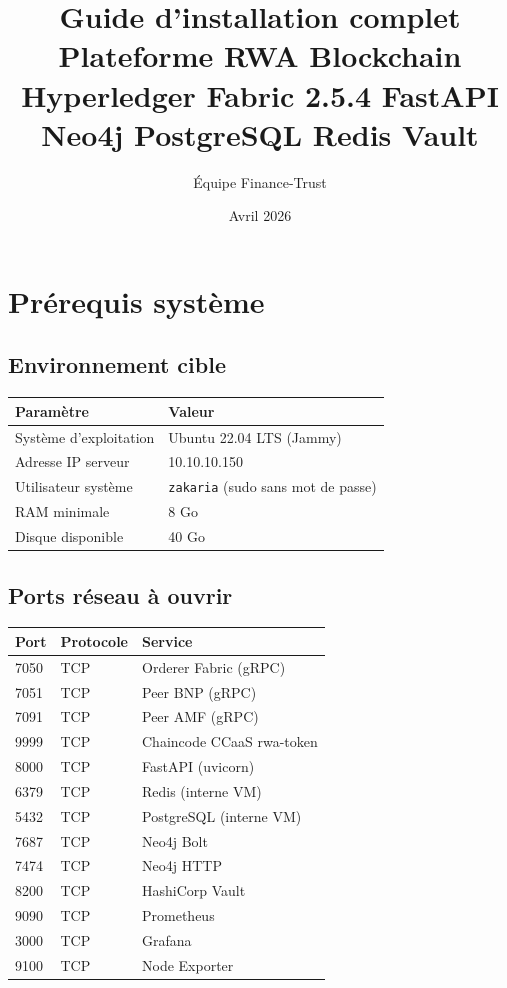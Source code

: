 \documentclass[12pt,a4paper,french]{article}
\title{
  \vspace{-1cm}
  {\LARGE\bfseries Guide d'installation complet}\\[0.5em]
  {\large Plateforme RWA Blockchain}\\[0.3em]
  {\normalsize Hyperledger Fabric 2.5.4 \textbar{} FastAPI \textbar{} Neo4j \textbar{}
   PostgreSQL \textbar{} Redis \textbar{} Vault}
}
\author{Équipe Finance-Trust}
\date{Avril 2026}
\begin{document}
\maketitle
\tableofcontents
\newpage

\section{Prérequis système}

\subsection{Environnement cible}

\begin{tabularx}{\linewidth}{lX}
\toprule
\textbf{Paramètre} & \textbf{Valeur} \\
\midrule
Système d'exploitation & Ubuntu 22.04 LTS (Jammy) \\
Adresse IP serveur & 10.10.10.150 \\
Utilisateur système & \texttt{zakaria} (sudo sans mot de passe) \\
RAM minimale & 8 Go \\
Disque disponible & 40 Go \\
\bottomrule
\end{tabularx}

\subsection{Ports réseau à ouvrir}

\begin{tabularx}{\linewidth}{llX}
\toprule
\textbf{Port} & \textbf{Protocole} & \textbf{Service} \\
\midrule
7050 & TCP & Orderer Fabric (gRPC) \\
7051 & TCP & Peer BNP (gRPC) \\
7091 & TCP & Peer AMF (gRPC) \\
9999 & TCP & Chaincode CCaaS rwa-token \\
8000 & TCP & FastAPI (uvicorn) \\
6379 & TCP & Redis (interne VM) \\
5432 & TCP & PostgreSQL (interne VM) \\
7687 & TCP & Neo4j Bolt \\
7474 & TCP & Neo4j HTTP \\
8200 & TCP & HashiCorp Vault \\
9090 & TCP & Prometheus \\
3000 & TCP & Grafana \\
9100 & TCP & Node Exporter \\
\bottomrule
\end{tabularx}
\end{document}
